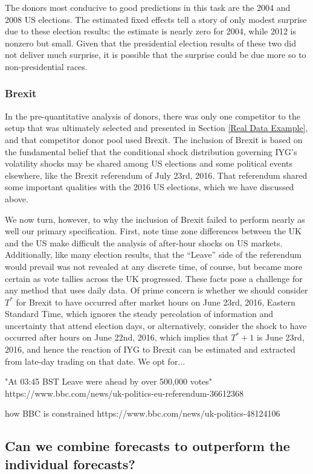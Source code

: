 \documentclass[11pt,3p,review,authoryear]{elsarticle}
\theoremstyle{definition}
\begin{document}
The donors most conducive to good predictions in this task are the 2004 and 2008 US elections.  The estimated fixed effects tell a story of only modest surprise due to these election results: the estimate is nearly zero for 2004, while 2012 is nonzero but small.  Given that the presidential election results of these two did not deliver much surprise, it is possible that the surprise could be due more so to non-presidential races.

\subsubsection{Brexit}
In the pre-quantitative analysis of donors, there was only one competitor to the setup that was ultimately selected and presented in Section \ref{Real Data Example}, and that competitor donor pool used Brexit.  The inclusion of Brexit is based on the fundamental belief that the conditional shock distribution governing IYG's volatility shocks may be shared among US elections and some political events elsewhere, like the Brexit referendum of July 23rd, 2016.  That referendum shared some important qualities with the 2016 US elections, which we have discussed above.

We now turn, however, to why the inclusion of Brexit failed to perform nearly as well our primary specification.  First, note time zone differences between the UK and the US make difficult the analysis of after-hour shocks on US markets.  Additionally, like many election results, that the ``Leave'' side of the referendum would prevail was not revealed at any discrete time, of course, but became more certain as vote tallies across the UK progressed.  These facts pose a challenge for any method that uses daily data.  Of prime concern is whether we should consider $T^{*}$ for Brexit to have occurred after market hours on June 23rd, 2016, Eastern Standard Time, which ignores the steady percolation of information and uncertainty that attend election days, or alternatively, consider the shock to have occurred after hours on June 22nd, 2016, which implies that $T^{*}+1$ is June 23rd, 2016, and hence the reaction of IYG to Brexit can be estimated and extracted from late-day trading on that date.  We opt for...

"At 03:45 BST Leave were ahead by over 500,000 votes"
https://www.bbc.com/news/uk-politics-eu-referendum-36612368

how BBC is constrained
https://www.bbc.com/news/uk-politics-48124106

\subsection{Can we combine forecasts to outperform the individual forecasts?}
\end{document}
